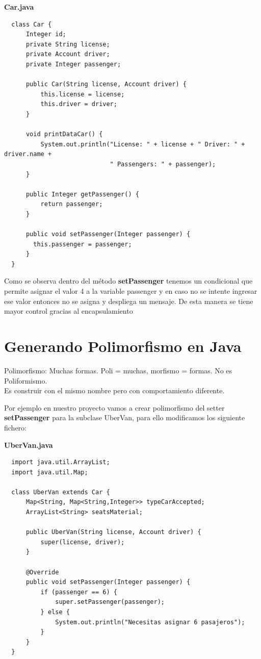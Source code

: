 \documentclass{article}
\begin{document}
\textbf{Car.java}
\begin{verbatim}
  class Car {
      Integer id;
      private String license;
      private Account driver;
      private Integer passenger;

      public Car(String license, Account driver) {
          this.license = license;
          this.driver = driver;
      }

      void printDataCar() {
          System.out.println("License: " + license + " Driver: " + driver.name +
                             " Passengers: " + passenger);
      }

      public Integer getPassenger() {
          return passenger;
      }

      public void setPassenger(Integer passenger) {
        this.passenger = passenger;
      }
  }
\end{verbatim}

Como se observa dentro del método \textbf{setPassenger} tenemos un condicional
que permite asignar el valor 4 a la variable passenger y en caso no se intente
ingresar ese valor entonces no se asigna y despliega un mensaje. De esta manera
se tiene mayor control gracias al encapsulamiento\\

\section{Generando Polimorfismo en Java}%
Polimorfismo: Muchas formas. Poli = muchas, morfismo = formas. No es Poliformismo.\\
Es construir con el mismo nombre pero con comportamiento diferente.

Por ejemplo en nuestro proyecto vamos a crear polimorfismo del setter
\textbf{setPassenger} para la subclase UberVan, para ello modificamos los siguiente fichero:

\textbf{UberVan.java}
\begin{verbatim}
  import java.util.ArrayList;
  import java.util.Map;

  class UberVan extends Car {
      Map<String, Map<String,Integer>> typeCarAccepted;
      ArrayList<String> seatsMaterial;

      public UberVan(String license, Account driver) {
          super(license, driver);
      }

      @Override
      public void setPassenger(Integer passenger) {
          if (passenger == 6) {
              super.setPassenger(passenger);
          } else {
              System.out.println("Necesitas asignar 6 pasajeros");
          }
      }
  }
\end{verbatim}
\end{document}
